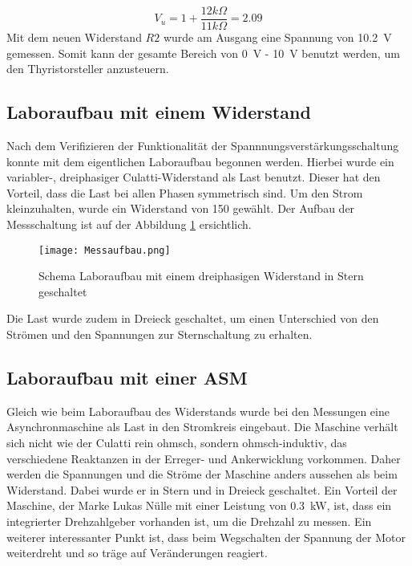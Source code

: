 \begin{equation}
V_u = 1 + \frac{12k\Omega}{11k\Omega} = 2.09
\end{equation}
Mit dem neuen Widerstand $R2$ wurde am Ausgang  eine Spannung von \SI{10.2}{V} gemessen. Somit kann der gesamte Bereich von \SI{0}{V} - \SI{10}{V} benutzt werden, um den Thyristorsteller anzusteuern.

\subsection{Laboraufbau mit einem Widerstand}
Nach dem Verifizieren der Funktionalität der Spannnungsverstärkungsschaltung konnte mit dem eigentlichen Laboraufbau begonnen werden. Hierbei wurde ein variabler-, dreiphasiger Culatti-Widerstand als Last benutzt. Dieser hat den Vorteil, dass die Last bei allen Phasen symmetrisch sind. Um den Strom kleinzuhalten, wurde ein Widerstand von \SI{150}{\Omega} gewählt. Der Aufbau der Messschaltung ist auf der Abbildung \ref{fig:Messaufbau} ersichtlich.


\begin{figure}[ht!]
	\centering
	\texttt{[image: Messaufbau.png]}	
	\caption{Schema Laboraufbau mit einem dreiphasigen Widerstand in Stern geschaltet}\label{fig:Messaufbau}
\end{figure}

Die Last wurde zudem in Dreieck geschaltet, um einen Unterschied von den Strömen und den Spannungen zur Sternschaltung zu erhalten.

\subsection{Laboraufbau mit einer ASM}

Gleich wie beim Laboraufbau des Widerstands wurde bei den Messungen eine Asynchronmaschine als Last in den Stromkreis eingebaut. Die Maschine verhält sich nicht wie der Culatti rein ohmsch, sondern ohmsch-induktiv, das verschiedene Reaktanzen in der Erreger- und Ankerwicklung vorkommen. Daher werden die Spannungen und die Ströme der Maschine anders aussehen als beim Widerstand.  Dabei wurde er in Stern und in Dreieck geschaltet. Ein Vorteil der Maschine, der Marke Lukas Nülle mit einer Leistung von \SI{0.3}{kW}, ist, dass ein integrierter Drehzahlgeber vorhanden ist, um die Drehzahl zu messen. Ein weiterer interessanter Punkt ist, dass beim Wegschalten der Spannung der Motor weiterdreht und so träge auf Veränderungen reagiert.  



